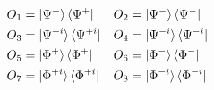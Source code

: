 \documentclass[preview, border={5pt,5pt,5pt,5pt}]{standalone}
\newcommand{\ketbra}[1]{\ket{#1}\bra{#1}}
\begin{document}
$
\begin{aligned}
    O_1 &=\ketbra{\Psi^+}       & O_2 &=\ketbra{\Psi^{-}}\\
    O_3 &=\ketbra{\Psi^{+i}}    & O_4 &=\ketbra{\Psi^{-i}}\\
    O_5 &=\ketbra{\Phi^+}       & O_6 &= \ketbra{\Phi^{-}}\\
    O_7 &=\ketbra{\Phi^{+i}}    & O_8 &= \ketbra{\Phi^{-i}}
\end{aligned}
$
\end{document}
